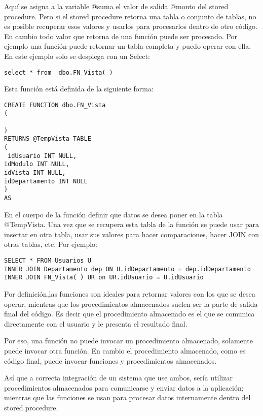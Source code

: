 \documentclass[10pt]{article}
\begin{document}
 Aquí se asigna a la variable @suma el valor de salida @monto del stored procedure. Pero si el stored procedure retorna una tabla o conjunto de tablas, no es posible recuperar esos valores y usarlos para procesarlos dentro de otro código. En cambio todo valor que retorna de una función puede ser procesado.  Por ejemplo una función puede retornar un tabla completa y puedo operar con ella. En este ejemplo solo se desplega con un Select:
 
\begin{verbatim}
select * from  dbo.FN_Vista( )
\end{verbatim}

Esta función está definida de la siguiente forma:

\begin{verbatim}
CREATE FUNCTION dbo.FN_Vista
(  

)  
RETURNS @TempVista TABLE   
(  
 idUsuario INT NULL,
idModulo INT NULL,
idVista INT NULL,
idDepartamento INT NULL
)  
AS
\end{verbatim}

En el cuerpo de la función definir que datos se desea poner en la tabla @TempVista. Una vez que se recupera esta tabla de la función se puede usar para insertar en otra tabla, usar sus valores para hacer comparaciones, hacer JOIN con otras tablas, etc. Por ejemplo:

\begin{verbatim}
SELECT * FROM Usuarios U 
INNER JOIN Departamento dep ON U.idDepartamento = dep.idDepartamento
INNER JOIN FN_Vista( ) UR on UR.idUsuario = U.idUsuario
\end{verbatim}

Por definición,las funciones son ideales para retornar valores con los que se desea operar, mientras que los procedimientos almacenados suelen ser la parte de salida final del código. Es decir que el procedimiento almacenado es el que se comunica directamente con el usuario y le presenta el resultado final.

Por eso, una función no puede invocar un procedimiento almacenado,  solamente puede invocar otra función. En cambio el procedimiento almacenado, como es código final, puede invocar funciones y procedimientos almacenados.

Así que a correcta integración de un sistema que use ambos, sería utilizar procedimientos almacenados para comunicarse y enviar datos a la aplicación; mientras que las funciones se usan para procesar datos internamente dentro del stored procedure.

\printbibliography
\end{document}
